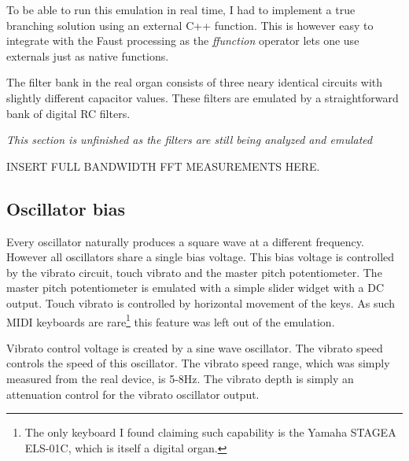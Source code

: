 \documentclass[11pt,a4paper]{article}
\begin{document}
To be able to run this emulation in real time, I had to implement a true branching solution using an external C++ function. This is however easy to integrate with the Faust processing as the \emph{ffunction} operator lets one use externals just as native functions.

The filter bank in the real organ consists of three neary identical circuits with slightly different capacitor values. These filters are emulated by a straightforward bank of digital RC filters.


\emph{This section is unfinished as the filters are still being analyzed and emulated}

INSERT FULL BANDWIDTH FFT MEASUREMENTS HERE.

\subsection{Oscillator bias}
\label{section:oscillator-bias}

Every oscillator naturally produces a square wave at a different frequency. However all oscillators share a single bias voltage. This bias voltage is controlled by the vibrato circuit, touch vibrato and the master pitch potentiometer. The master pitch potentiometer is emulated with a simple slider widget with a DC output. Touch vibrato is controlled by horizontal movement of the keys. As such MIDI keyboards are rare\footnote{The only keyboard I found claiming such capability is the Yamaha STAGEA ELS-01C, which is itself a digital organ.} this feature was left out of the emulation.

Vibrato control voltage is created by a sine wave oscillator. The vibrato speed controls the speed of this oscillator. The vibrato speed range, which was simply measured from the real device, is 5-8Hz. The vibrato depth is simply an attenuation control for the vibrato oscillator output.

\end{document}
